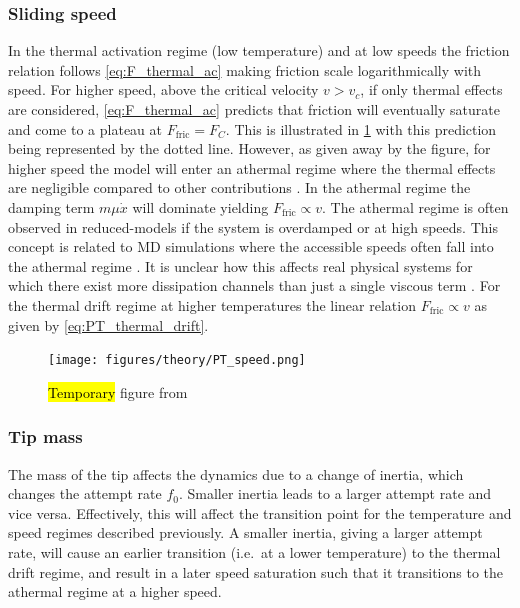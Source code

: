 

\subsubsection{Sliding speed}
In the thermal activation regime (low temperature) and at low speeds the friction relation follows \cref{eq:F_thermal_ac} making friction scale logarithmically with speed. For higher speed, above the critical velocity $v > v_c$, if only thermal effects are considered, \cref{eq:F_thermal_ac} predicts that friction will eventually saturate and come to a plateau at $F_{\text{fric}} = F_C$. This is illustrated in \cref{fig:PT_speed} with this prediction being represented by the dotted line. However, as given away by the figure, for higher speed the model will enter an athermal regime where the thermal effects are negligible compared to other contributions \cite{PhysRevLett.89.224301}. In the athermal regime the damping term $m\mu \dot{x}$ will dominate yielding $F_{\text{fric}}
\propto v$. The athermal regime is often observed in reduced-models if the system is overdamped or at high speeds. This concept is related to \acrshort{MD} simulations where the accessible speeds often fall into the athermal regime \cite{Li_2011}. It is unclear how this affects real physical systems for which there exist more dissipation channels than just a single viscous term \cite{Dong_2013}. For the thermal drift regime at higher temperatures the linear relation $F_{\text{fric}} \propto v$ as given by \cref{eq:PT_thermal_drift}.

\begin{figure}[H]
  \centering
  \texttt{[image: figures/theory/PT\_speed.png]}
  \caption{\hl{Temporary} figure from \cite{Yalin_2011}}
  \label{fig:PT_speed}
\end{figure}


\subsubsection{Tip mass}
The mass of the tip affects the dynamics due to a change of inertia, which changes the attempt rate $f_0$. Smaller inertia leads to a larger attempt rate and vice versa. Effectively, this will affect the transition point for the temperature and speed regimes described previously. A smaller inertia, giving a larger attempt rate, will cause an earlier transition (i.e.\ at a lower temperature) to the thermal drift regime, and result in a later speed saturation such that it transitions to the athermal regime at a higher speed. 


